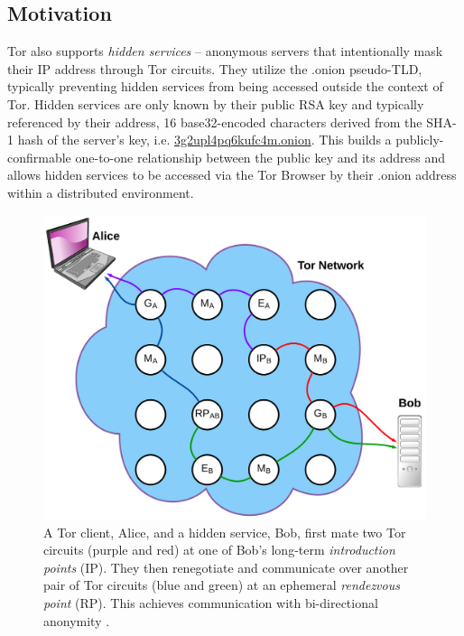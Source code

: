 \documentclass[USenglish,oneside,twocolumn]{article}
\begin{document}
\subsection{Motivation}

Tor also supports \emph{hidden services} -- anonymous servers that intentionally mask their IP address through Tor circuits. They utilize the .onion pseudo-TLD, typically preventing hidden services from being accessed outside the context of Tor. Hidden services are only known by their public RSA key and typically referenced by their address, 16 base32-encoded characters derived from the SHA-1 hash of the server's key, i.e. \url{3g2upl4pq6kufc4m.onion}. This builds a publicly-confirmable one-to-one relationship between the public key and its address and allows hidden services to be accessed via the Tor Browser by their .onion address within a distributed environment.

\begin{figure}[htbp]
	\centering
	\includegraphics[width=0.9\linewidth]{../assets/images/LucidCharts/Hidden_Services.pdf}
	\caption{A Tor client, Alice, and a hidden service, Bob, first mate two Tor circuits (purple and red) at one of Bob's long-term \emph{introduction points} (IP). They then renegotiate and communicate over another pair of Tor circuits (blue and green) at an ephemeral \emph{rendezvous point} (RP). This achieves communication with bi-directional anonymity \cite{overlier2006locating}.}
\end{figure}
\end{document}
